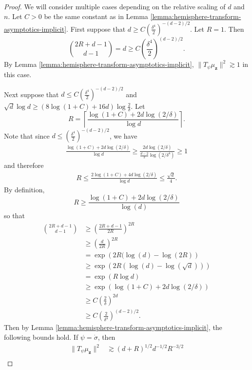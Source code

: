 \documentclass{article}
\theoremstyle{definition}
\def\vz{{\bm{z}}}
\begin{document}
\CorrHemisphereTransformAsymptotics*
\begin{proof}
    We will consider multiple cases depending on the relative scaling of $d$ and $n$. Let $C > 0$ be the same constant as in Lemma \ref{lemma:hemisphere-transform-asymptotics-implicit}. First suppose that $d \geq C\left(\frac{\delta^4}{2} \right)^{-(d - 2)/2}$. Let $R = 1$. Then
    \[\binom{2R + d - 1}{d - 1} = d \geq C\left(\frac{\delta^4}{2}\right)^{(d - 2)/2}. \]
    By Lemma \ref{lemma:hemisphere-transform-asymptotics-implicit}, $\|T_{\psi}\mu_{\vz}\|^2 \gtrsim 1$ in this case. 
    
    Next suppose that $d \leq C\left(\frac{\delta^4}{2}\right)^{-(d - 2)/2}$ and $\sqrt{d} \log d \geq (8\log(1 + C) + 16 d)\log \frac{2}{\delta}$. Let \[R = \left\lceil    \frac{\log(1 + C) + 2d \log(2/\delta) }{\log d} \right\rceil.\] Note that since $d \leq \left(\frac{\delta^4}{2}\right)^{-(d - 2)/2}$, we have
    \begin{align*}
         \frac{\log(1 + C) +2d \log(2/\delta)}{\log d} \geq \frac{2d\log(2/\delta) }{\frac{d - 2}{2}\log(2/\delta^4) } \geq 1
    \end{align*}
    and therefore
    \begin{align*}
        R \leq  \frac{2\log(1 + C) +4d\log(2/\delta) }{\log d} \leq \frac{\sqrt{d}}{4}.
    \end{align*}
    By definition,
    \[R \geq \frac{\log(1 + C) + 2d\log(2/\delta) }{\log(d)} \]
    so that
    \begin{align*}
        \binom{2R + d - 1}{d - 1} &\geq \left(\frac{2R + d - 1}{2R}\right)^{2R}\\
        &\geq \left(\frac{d}{2R}\right)^{2R}\\
        &= \exp\left(2R(\log (d) - \log(2R) \right)\\
        &\geq \exp\left(2R\left(\log(d) - \log\left(\sqrt{d}\right)\right) \right)\\
        &= \exp\left(R \log d \right)\\
        &\geq \exp(\log(1 + C) + 2d\log(2/\delta))\\
        &\geq C\left(\frac{2}{\delta}\right)^{2d}\\
        &\geq C\left(\frac{2}{\delta^4}\right)^{(d - 2)/2}.
    \end{align*}
    Then by Lemma \ref{lemma:hemisphere-transform-asymptotics-implicit}, the following bounds hold. If $\psi = \dot{\sigma}$, then
    \begin{align*}
        \|T_{\psi}\mu_{\vz}\|^2 &\gtrsim (d + R)^{1/2}d^{-1/2}R^{-3/2}\\

\end{align*}
\end{proof}
\end{document}
